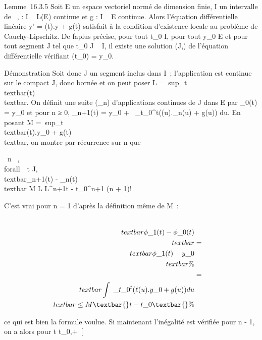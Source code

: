 \documentclass[]{article}
\begin{document}
Lemme~16.3.5 Soit E un espace vectoriel normé de dimension finie, I un
intervalle de ~, \ell : I \rightarrow~ L(E) continue et g : I \rightarrow~ E continue. Alors
l'équation différentielle linéaire y' = \ell(t).y + g(t) satisfait à la
condition d'existence locale au problème de Cauchy-Lipschitz. De
fa\ccon plus précise, pour tout t\_0 \in I,
pour tout y\_0 \in E et pour tout segment J tel que t\_0 \in
J \subset~ I, il existe une solution (J,\phi) de l'équation différentielle
vérifiant \phi(t\_0) = y\_0.

Démonstration Soit donc J un segment inclus dans I~; l'application \ell est
continue sur le compact J, donc bornée et on peut poser L
=\
sup\_t\inJ\\textbar{}\ell(t)\\textbar{}.
On définit une suite (\phi\_n) d'applications continues de J dans E
par \phi\_0(t) = y\_0 et pour n ≥ 0, \phi\_n+1(t) =
y\_0 +\int ~
\_t\_0^t\left (\ell(u).\phi\_n(u)
+ g(u)\right ) du. En posant M
=\
sup\_t\inJ\\textbar{}\ell(t).y\_0 +
g(t)\\textbar{}, on montre par récurrence sur n que

\forall~n \in {}~, \\forall~~t \in J,
\\textbar{}\phi\_n+1(t) -
\phi\_n(t)\\textbar{} \leq M \over L
 L^n+1\textbar{}t - t\_0\textbar{}^n+1
\over (n + 1)!

C'est vrai pour n = 1 d'après la définition même de M~:

\begin{align*}
\\textbar{}\phi\_1(t) -
\phi\_0(t)\\textbar{}& =&
\\textbar{}\phi\_1(t) -
y\_0\\textbar{} \%&
\\ & =&
\\textbar{}\int ~
\_t\_0^t(\ell(u).y\_ 0 + g(u))
du\\textbar{} \leq M\textbar{}t - t\_0\textbar{}\%&
\\ \end{align*}

ce qui est bien la formule voulue. Si maintenant l'inégalité est
vérifiée pour n - 1, on a alors pour t \in {[}t\_0,+\infty~{[}\bigcapJ
\end{document}
